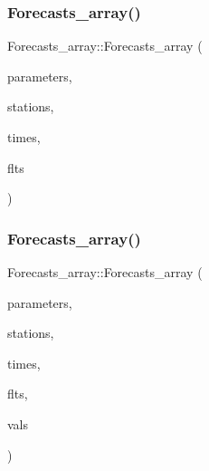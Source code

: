 \subsubsection{\texorpdfstring{Forecasts\+\_\+array()}{Forecasts\_array()}\hspace{0.1cm}{\footnotesize\ttfamily [3/4]}}
{\footnotesize\ttfamily Forecasts\+\_\+array\+::\+Forecasts\+\_\+array (\begin{DoxyParamCaption}\item[{\mbox{\hyperlink{classanen_par_1_1_parameters}{anen\+Par\+::\+Parameters}}}]{parameters,  }\item[{\mbox{\hyperlink{classanen_sta_1_1_stations}{anen\+Sta\+::\+Stations}}}]{stations,  }\item[{\mbox{\hyperlink{classanen_time_1_1_times}{anen\+Time\+::\+Times}}}]{times,  }\item[{\mbox{\hyperlink{classanen_time_1_1_f_l_ts}{anen\+Time\+::\+F\+L\+Ts}}}]{flts }\end{DoxyParamCaption})}

\mbox{\label{class_forecasts__array_ac50579e66269d92ebdbc4dc1ea07f7c8}} 
\subsubsection{\texorpdfstring{Forecasts\+\_\+array()}{Forecasts\_array()}\hspace{0.1cm}{\footnotesize\ttfamily [4/4]}}
{\footnotesize\ttfamily Forecasts\+\_\+array\+::\+Forecasts\+\_\+array (\begin{DoxyParamCaption}\item[{\mbox{\hyperlink{classanen_par_1_1_parameters}{anen\+Par\+::\+Parameters}}}]{parameters,  }\item[{\mbox{\hyperlink{classanen_sta_1_1_stations}{anen\+Sta\+::\+Stations}}}]{stations,  }\item[{\mbox{\hyperlink{classanen_time_1_1_times}{anen\+Time\+::\+Times}}}]{times,  }\item[{\mbox{\hyperlink{classanen_time_1_1_f_l_ts}{anen\+Time\+::\+F\+L\+Ts}}}]{flts,  }\item[{const std\+::vector$<$ double $>$ \&}]{vals }\end{DoxyParamCaption})}

\mbox{\label{class_forecasts__array_a7e13cb82b1ab76a45946cff992c7fff4}} 
